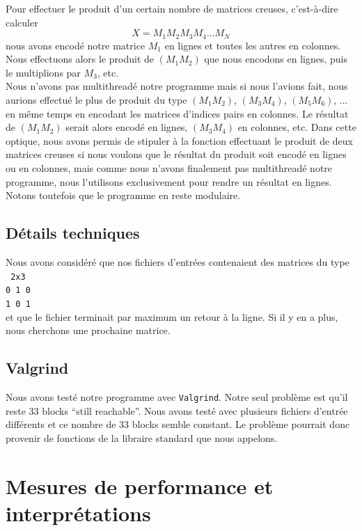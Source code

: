\documentclass[12pt,a4paper]{article}
\begin{document}
Pour effectuer le produit d'un certain nombre de matrices creuses, c'est-à-dire calculer $$X = M_1 M_2 M_3 M_4 ... M_N$$
nous avons encodé notre matrice $M_1$ en lignes et toutes les autres en colonnes. Nous effectuons alors le produit de $(M_1 M_2)$ que nous encodons en lignes, puis le multiplions par $M_3$, etc.\\

Nous n'avons pas multithreadé notre programme mais si nous l'avions fait, nous aurions effectué le plus de produit du type $(M_1 M_2)$, $(M_3 M_4)$, $(M_5 M_6)$, ... en même temps en encodant les matrices d'indices pairs en colonnes. Le résultat de $(M_1 M_2)$ serait alors encodé en lignes, $(M_3 M_4)$ en colonnes, etc. Dans cette optique, nous avons permis de stipuler à la fonction effectuant le produit de deux matrices creuses si nous voulons que le résultat du produit soit encodé en lignes ou en colonnes, mais comme nous n'avons finalement pas multithreadé notre programme, nous l'utilisons exclusivement pour rendre un résultat en lignes. Notons toutefois que le programme en reste modulaire.

\subsection{Détails techniques}
Nous avons considéré que nos fichiers d'entrées contenaient des matrices du type\\
\texttt{
2x3\\
0 1 0 \\
1 0 1\\}
et que le fichier terminait par maximum un retour à la ligne. Si il y en a plus, nous cherchons une prochaine matrice.

\subsection{Valgrind}

Nous avons testé notre programme avec \texttt{Valgrind}. Notre seul problème est qu'il reste $33$ blocks ``still reachable''. Nous avons testé avec plusieurs fichiers d'entrée différents et ce nombre de 33 blocks semble constant. Le problème pourrait donc provenir de fonctions de la libraire standard que nous appelons.

\section{Mesures de performance et interprétations}
\end{document}

